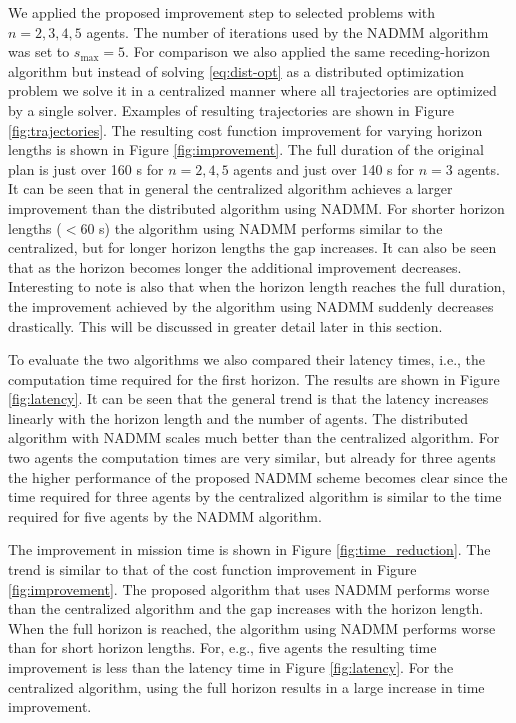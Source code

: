 \documentclass[letterpaper, 10 pt, conference]{ieeeconf}  %
\begin{document}
We applied the proposed improvement step to selected problems with $n=2, 3, 4, 5$ agents. The number of iterations used by the NADMM algorithm was set to $s_{\text{max}} = 5$. For comparison we also applied the same receding-horizon algorithm but instead of solving \eqref{eq:dist-opt} as a distributed optimization problem we solve it in a centralized manner where all trajectories are optimized by a single solver. Examples of resulting trajectories are shown in Figure \ref{fig:trajectories}. The resulting cost function improvement for varying horizon lengths is shown in Figure \ref{fig:improvement}. The full duration of the original plan is just over 160 s for $n=2, 4, 5$ agents and just over 140 s for $n=3$ agents. It can be seen that in general the centralized algorithm achieves a larger improvement than the distributed algorithm using NADMM. For shorter horizon lengths ($< 60$ s) the algorithm using NADMM performs similar to the centralized, but for longer horizon lengths the gap increases. It can also be seen that as the horizon becomes longer the additional improvement decreases. Interesting to note is also that when the horizon length reaches the full duration, the improvement achieved by the algorithm using NADMM suddenly decreases drastically. This will be discussed in greater detail later in this section.

To evaluate the two algorithms we also compared their latency times, i.e., the computation time required for the first horizon. The results are shown in Figure \ref{fig:latency}. It can be seen that the general trend is that the latency increases linearly with the horizon length and the number of agents. The distributed algorithm with NADMM scales much better than the centralized algorithm. For two agents the computation times are very similar, but already for three agents the higher performance of the proposed NADMM scheme becomes clear since the time required for three agents by the centralized algorithm is similar to the time required for five agents by the NADMM algorithm. 

The improvement in mission time is shown in Figure \ref{fig:time_reduction}. The trend is similar to that of the cost function improvement in Figure \ref{fig:improvement}. The proposed algorithm that uses NADMM performs worse than the centralized algorithm and the gap increases with the horizon length. When the full horizon is reached, the algorithm using NADMM performs worse than for short horizon lengths. For, e.g., five agents the resulting time improvement is less than the latency time in Figure \ref{fig:latency}. For the centralized algorithm, using the full horizon results in a large increase in time improvement.
\end{document}
